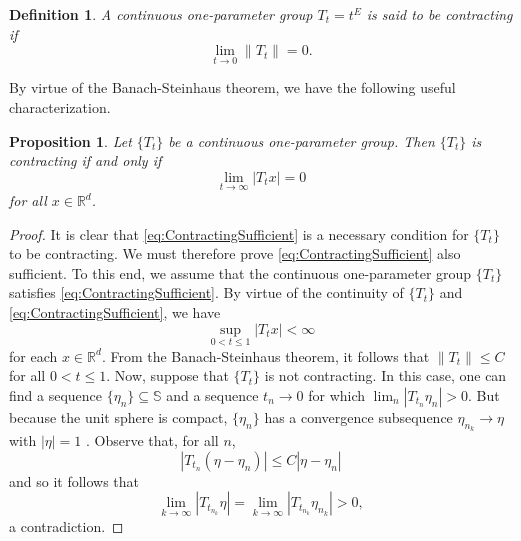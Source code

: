 \documentclass[11pt]{article}
\newtheorem{definition}[theorem]{Definition}
\newtheorem{proposition}[theorem]{Proposition}
\begin{document}
\begin{definition} A continuous one-parameter group $T_t=t^E$ is said to be \textit{contracting} if
\begin{equation*}
\lim_{t\to 0}\|T_t\|=0. 
\end{equation*}
\end{definition}
\noindent By virtue of the Banach-Steinhaus theorem, we have the following useful characterization.
\begin{proposition}\label{prop:ContractingCharacterization}
Let $\{T_t\}$ be a continuous one-parameter group. Then $\{T_t\}$ is contracting if and only if
\begin{equation}\label{eq:ContractingSufficient}
\lim_{t\to\infty}|T_tx|=0
\end{equation}
for all $x\in\mathbb{R}^d$.
\end{proposition}

\begin{proof}It is clear that \eqref{eq:ContractingSufficient} is a necessary condition for $\{T_t\}$ to be contracting. We must therefore prove \eqref{eq:ContractingSufficient} also sufficient. To this end, we assume that the continuous one-parameter group $\{T_t\}$ satisfies \eqref{eq:ContractingSufficient}. By virtue of the continuity of $\{T_t\}$ and \eqref{eq:ContractingSufficient}, we have
\begin{equation*}
\sup_{0<t\leq 1}|T_t x|<\infty
 \end{equation*}
for each $x\in\mathbb{R}^d$. From the Banach-Steinhaus theorem, it follows that $\|T_t\|\leq C$ for all $0<t\leq 1$. Now, suppose that $\{T_t\}$ is not contracting. In this case, one can find a sequence $\{\eta_n\}\subseteq\mathbb{S}$ and a sequence $t_n\rightarrow 0$ for which $\lim_n|T_{t_n}\eta_n|>0$. But because the unit sphere is compact, $\{\eta_n\}$ has a convergence subsequence $\eta_{n_k}\rightarrow \eta$ with $|\eta|=1$ . Observe that, for all $n$,
 \begin{equation*}
 |T_{t_n}(\eta-\eta_n)|\leq C|\eta-\eta_n|
 \end{equation*}
 and so it follows that
 \begin{equation*}
 \lim_{k\rightarrow\infty}|T_{t_{n_k}}\eta|=\lim_{k\rightarrow\infty}|T_{t_{n_k}}\eta_{n_k}|>0,
 \end{equation*}
 a contradiction.
 \end{proof}
\end{document}

